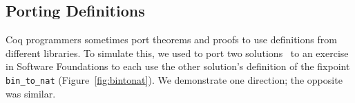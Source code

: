 


\subsection{Porting Definitions}
\label{sec:foundations}

Coq programmers sometimes port theorems and proofs to use definitions
from different libraries.
To simulate this, we used \sysname to port two solutions~\cite{usera, userb}
to an exercise in Software Foundations to each use the other solution's definition of the fixpoint \lstinline{bin_to_nat} (Figure~\ref{fig:bintonat}).
We demonstrate one direction; the opposite was similar.




